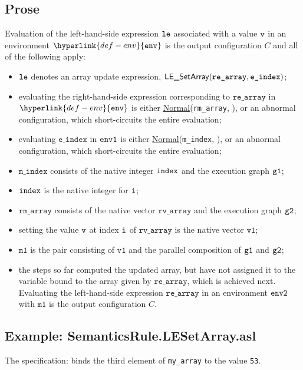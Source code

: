 \documentclass{book}
\newcommand\ProseOrAbnormal[0]{or an abnormal configuration, which short-circuits the entire evaluation}
\newcommand\Normal[0]{\hyperlink{def-normal}{\textsf{Normal}}}
\newcommand\env[0]{\hyperlink{def-env}{\texttt{env}}}
\newcommand\vvone[0]{\texttt{v1}}
\newcommand\vmone[0]{\texttt{m1}}
\newcommand\eindex[0]{\texttt{e\_index}}
\newcommand\mindex[0]{\texttt{m\_index}}
\newcommand\rearray[0]{\texttt{re\_array}}
\newcommand\rvarray[0]{\texttt{rv\_array}}
\newcommand\rmarray[0]{\texttt{rm\_array}}
\begin{document}
  \subsection{Prose}
  Evaluation of the left-hand-side expression $\texttt{le}$ associated with a
  value $\texttt{v}$ in an environment $\env$ is the output configuration $C$
  and all of the following apply:
  \begin{itemize}
  \item $\texttt{le}$ denotes an array update expression, $\LESetArray(\rearray, \eindex)$;
  \item evaluating the right-hand-side expression corresponding to $\rearray$ in $\env$
  is either \Normal(\rmarray, \envone), \ProseOrAbnormal;
  \item evaluating $\eindex$ in $\texttt{env1}$ is either \Normal(\mindex, \envtwo), \ProseOrAbnormal;
  \item $\mindex$ consists of the native integer $\texttt{index}$ and the execution graph $\texttt{g1}$;
  \item $\texttt{index}$ is the native integer for $\texttt{i}$;
  \item $\rmarray$ consists of the native vector $\rvarray$ and the execution graph $\texttt{g2}$;
  \item setting the value $\texttt{v}$ at index $\texttt{i}$ of $\rvarray$ is the native vector $\vvone$;
  \item $\vmone$ is the pair consisting of $\vvone$ and the parallel composition of $\texttt{g1}$ and $\texttt{g2}$;
  \item the steps so far computed the updated array, but have not assigned it to the variable
  bound to the array given by $\rearray$, which is achieved next.
  Evaluating the left-hand-side expression $\rearray$ in an environment $\texttt{env2}$ with $\vmone$
  is the output configuration $C$.
  \end{itemize}

  \subsection{Example: SemanticsRule.LESetArray.asl}
  The specification:
  binds the third element of \texttt{my\_array} to the value \texttt{53}.


\end{document}
